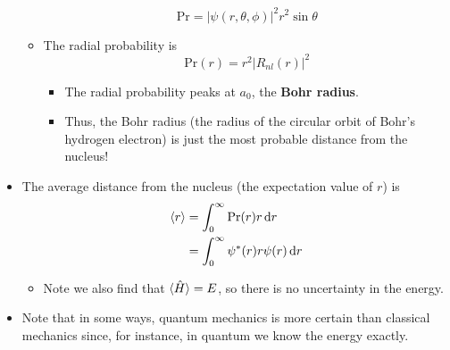 \documentclass[../notes.tex]{subfiles}
\begin{document}
\begin{itemize}
\begin{itemize}
\begin{equation*}
            \text{Pr} = |\psi(r,\theta,\phi)|^2r^2\sin\theta
        \end{equation*}
        \item The radial probability is
        \begin{equation*}
            \text{Pr}(r) = r^2|R_{nl}(r)|^2
        \end{equation*}
        \begin{itemize}
            \item The radial probability peaks at $a_0$, the \textbf{Bohr radius}.
            \item Thus, the Bohr radius (the radius of the circular orbit of Bohr's hydrogen electron) is just the most probable distance from the nucleus!
        \end{itemize}
    \end{itemize}
    \item The average distance from the nucleus (the expectation value of $r$) is
    \begin{align*}
        \langle{r}\rangle &= \int_0^\infty\text{Pr}(r)r\dd{r}\\
        &= \int_0^\infty\psi^*(r)r\psi(r)\dd{r}
    \end{align*}
    \begin{itemize}
        \item Note we also find that $\langle{\hat{H}}\rangle=E$, so there is no uncertainty in the energy.
    \end{itemize}
    \item Note that in some ways, quantum mechanics is more certain than classical mechanics since, for instance, in quantum we know the energy exactly.
\end{itemize}
\end{document}
